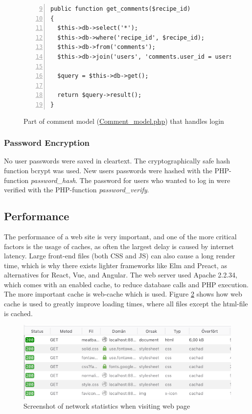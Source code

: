 \documentclass[a4paper]{scrartcl}
\begin{document}
\begin{figure}
\begin{lstlisting}[frame=single, numbers=left, breaklines=true, basicstyle=\ttfamily\footnotesize, firstnumber=9]
public function get_comments($recipe_id)
{
  $this->db->select('*');
  $this->db->where('recipe_id', $recipe_id);
  $this->db->from('comments');
  $this->db->join('users', 'comments.user_id = users.user_id');

  $query = $this->db->get();

  return $query->result();
}
\end{lstlisting}
\caption{Part of comment model (\href{https://github.com/juliuscc/kth-id1354/blob/master/homework-3/application/models/Comment\_model.php\#L9}{Comment\_model.php}) that handles login}
\label{fig:sql-injection}
\end{figure}

\subsubsection{Password Encryption}
No user passwords were saved in cleartext. The cryptographically safe hash function bcrypt was used. New users passwords were hashed with the PHP-function \textit{password\_hash}. The password for users who wanted to log in were verified with the PHP-function \textit{password\_verify}.

\subsection{Performance}
The performance of a web site is very important, and one of the more critical factors is the usage of caches, as often the largest delay is caused by internet latency. Large front-end files (both CSS and JS) can also cause a long render time, which is why there exists lighter frameworks like Elm and Preact, as alternatives for React, Vue, and Angular. The web server used Apache 2.2.34, which comes with an enabled cache, to reduce database calls and PHP execution. The more important cache is web-cache which is used. Figure \ref{fig:web-cache} shows how web cache is used to greatly improve loading times, where all files except the html-file is cached.

\begin{figure}
	\begin{center}
		\includegraphics[width=0.7\linewidth]{images/web-cache.png}
		\caption{Screenshot of network statistics when visiting web page}
		\label{fig:web-cache}
	\end{center}
\end{figure}
\end{document}
